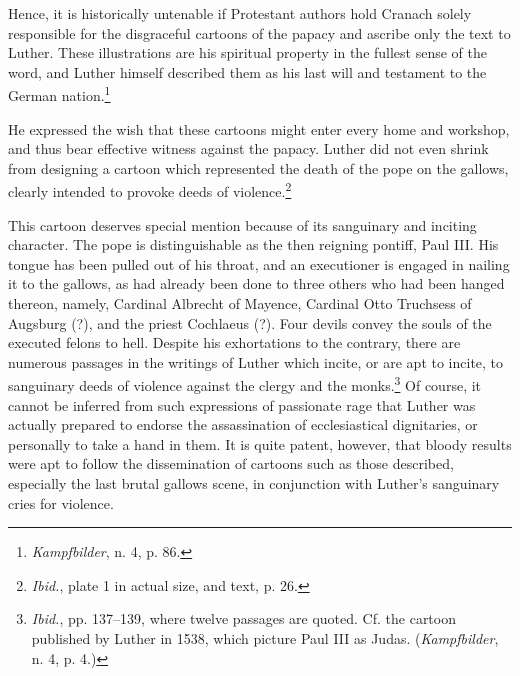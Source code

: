 Hence, it is historically untenable if Protestant authors hold Cranach
solely responsible for the disgraceful cartoons of the papacy and
ascribe only the text to Luther. These illustrations are his spiritual
property in the fullest sense of the word, and Luther himself described
them as his last will and testament to the German nation.\footnote{\textit{Kampfbilder}, n. 4, p. 86.}

He expressed the wish that these cartoons might enter every home
and workshop, and thus bear effective witness against the papacy.
Luther did not even shrink from designing a cartoon which represented
the death of the pope on the gallows, clearly intended to provoke deeds
of violence.\footnote{\textit{Ibid.}, plate 1 in actual size, and text, p. 26.}

This cartoon deserves special mention because of its sanguinary
and inciting character. The pope is distinguishable as the then reigning
pontiff, Paul III. His tongue has
been pulled out of his throat, and an executioner is engaged in nailing
it to the gallows, as had already been done to three others who had
been hanged thereon, namely, Cardinal Albrecht of Mayence, Cardinal Otto
Truchsess of Augsburg (?), and the priest Cochlaeus (?).
Four devils convey the souls of the executed felons to hell. Despite
his exhortations to the contrary, there are numerous passages in the
writings of Luther which incite, or are apt to incite, to sanguinary
deeds of violence against the clergy and the monks.\footnote
{\textit{Ibid.}, pp. 137--139, where twelve passages are quoted. Cf. the cartoon published by
Luther in 1538, which picture Paul III as Judas. (\textit{Kampfbilder}, n. 4, p. 4.)}
Of course, it
cannot be inferred from such expressions of passionate rage that
Luther was actually prepared to endorse the assassination of ecclesiastical
dignitaries, or personally to take a hand in them. It is quite patent,
however, that bloody results were apt to follow the dissemination
of cartoons such as those described, especially the last brutal
gallows scene, in conjunction with Luther’s sanguinary cries for violence.
